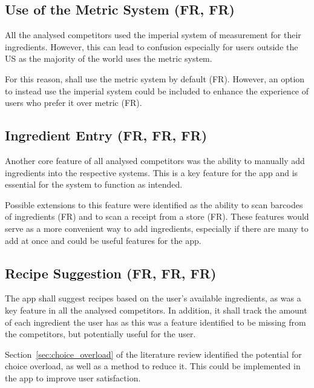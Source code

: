 \subsection{Use of the Metric System (FR, FR)}

All the analysed competitors used the imperial system of measurement for their ingredients. However, this
can lead to confusion especially for users outside the US as the majority of the world uses the metric system.~\cite{pomroy_metric_2008}

For this reason, \chef{} shall use the metric system by default (FR). However, an option to
instead use the imperial system could be included to enhance the experience of users who prefer it over metric (FR).

\subsection{Ingredient Entry (FR, FR, FR)}

Another core feature of all analysed competitors was the ability to manually add ingredients into the respective
systems. This is a key feature for the \chef{} app and is essential for the system to function as intended.

Possible extensions to this feature were identified as the ability to scan barcodes of ingredients (FR)
and to scan a receipt from a store (FR). These features would serve as a more convenient way to add
ingredients, especially if there are many to add at once and could be useful features for the \chef{} app.

\subsection{Recipe Suggestion (FR, FR, FR)}
The app shall suggest recipes based on the user's available ingredients, as was a key feature in
all the analysed competitors. In addition, it shall track the amount of each ingredient the user has
as this was a feature identified to be missing from the competitors, but potentially useful for the user.

Section~\ref{sec:choice_overload} of the literature review identified the potential for choice overload,
as well as a method to reduce it. This could be implemented in the \chef{} app to improve user satisfaction.

